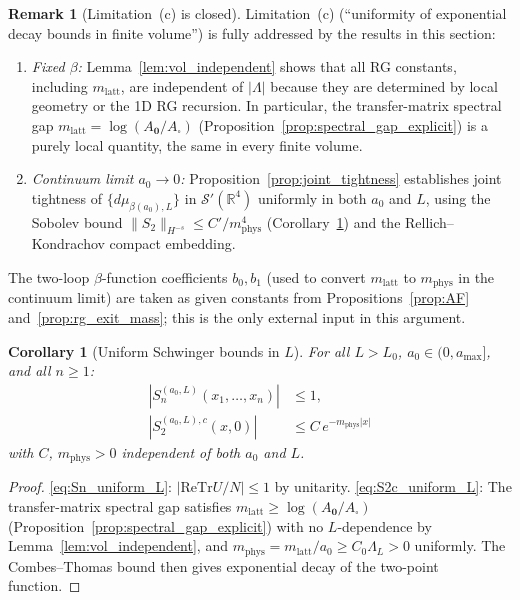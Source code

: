 \documentclass[11pt,a4paper]{amsart}
\newtheorem{corollary}[theorem]{Corollary}
\theoremstyle{definition}
\newtheorem{remark}[theorem]{Remark}
\newcommand{\R}{\mathbb{R}}
\newcommand{\re}{\mathrm{Re}}
\newcommand{\Tr}{\mathrm{Tr}}
\begin{document}
\begin{remark}[Limitation~(c) is closed]
\label{rem:c_closed}
Limitation~(c) (``uniformity of exponential decay bounds in finite volume'')
is fully addressed by the results in this section:
\begin{enumerate}[label=(\roman*),itemsep=2pt]
\item \emph{Fixed $\beta$:} Lemma~\ref{lem:vol_independent} shows that all
      RG constants, including $m_{\mathrm{latt}}$, are independent of $|\Lambda|$
      because they are determined by local geometry or the 1D RG recursion.
      In particular, the transfer-matrix spectral gap
      $m_{\mathrm{latt}} = \log(A_\mathbf{0}/A_\square)$ (Proposition~\ref{prop:spectral_gap_explicit})
      is a purely local quantity, the same in every finite volume.
\item \emph{Continuum limit $a_0 \to 0$:} Proposition~\ref{prop:joint_tightness}
      establishes joint tightness of $\{d\mu_{\beta(a_0),L}\}$ in $\mathcal{S}'(\R^4)$
      uniformly in both $a_0$ and $L$, using the Sobolev bound
      $\|S_2\|_{H^{-s}} \le C'/m_{\mathrm{phys}}^4$ (Corollary~\ref{cor:SW_uniform_L})
      and the Rellich--Kondrachov compact embedding.
\end{enumerate}
The two-loop $\beta$-function coefficients $b_0, b_1$ (used to convert
$m_{\mathrm{latt}}$ to $m_{\mathrm{phys}}$ in the continuum limit) are
taken as given constants from Propositions~\ref{prop:AF} and~\ref{prop:rg_exit_mass};
this is the only external input in this argument.
\end{remark}

\begin{corollary}[Uniform Schwinger bounds in $L$]
\label{cor:SW_uniform_L}
For all $L > L_0$, $a_0 \in (0,a_{\max}]$, and all $n\ge 1$:
\begin{align}
\label{eq:Sn_uniform_L}
  |S_n^{(a_0,L)}(x_1,\ldots,x_n)| &\le 1, \\
\label{eq:S2c_uniform_L}
  |S_2^{(a_0,L),c}(x,0)| &\le C\, e^{-m_{\mathrm{phys}}|x|}
\end{align}
with $C$, $m_{\mathrm{phys}} > 0$ independent of both $a_0$ and $L$.
\end{corollary}

\begin{proof}
\eqref{eq:Sn_uniform_L}: $|\re\Tr U/N|\le 1$ by unitarity.
\eqref{eq:S2c_uniform_L}: The transfer-matrix spectral gap satisfies
$m_{\mathrm{latt}} \ge \log(A_\mathbf{0}/A_\square)$ (Proposition~\ref{prop:spectral_gap_explicit})
with no $L$-dependence by Lemma~\ref{lem:vol_independent}, and
$m_{\mathrm{phys}} = m_{\mathrm{latt}}/a_0 \ge C_0\Lambda_L > 0$ uniformly.
The Combes--Thomas bound then gives exponential decay of the two-point function.
\end{proof}
\end{document}
